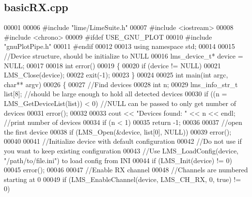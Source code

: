 \subsection{basic\+R\+X.\+cpp}
\label{basicRX_8cpp_source}

\begin{DoxyCode}
00001 
00006 \textcolor{preprocessor}{#include "lime/LimeSuite.h"}
00007 \textcolor{preprocessor}{#include <iostream>}
00008 \textcolor{preprocessor}{#include <chrono>}
00009 \textcolor{preprocessor}{#ifdef USE\_GNU\_PLOT}
00010 \textcolor{preprocessor}{#include "gnuPlotPipe.h"}
00011 \textcolor{preprocessor}{#endif}
00012 
00013 \textcolor{keyword}{using namespace }std;
00014 
00015 \textcolor{comment}{//Device structure, should be initialize to NULL}
00016 lms_device_t* device = NULL;
00017 
00018 \textcolor{keywordtype}{int} error()
00019 \{
00020     \textcolor{keywordflow}{if} (device != NULL)
00021         LMS_Close(device);
00022     exit(-1);
00023 \}
00024 
00025 \textcolor{keywordtype}{int} main(\textcolor{keywordtype}{int} argc, \textcolor{keywordtype}{char}** argv)
00026 \{
00027     \textcolor{comment}{//Find devices}
00028     \textcolor{keywordtype}{int} n;
00029     lms_info_str_t list[8]; \textcolor{comment}{//should be large enough to hold all detected devices}
00030     \textcolor{keywordflow}{if} ((n = LMS_GetDeviceList(list)) < 0) \textcolor{comment}{//NULL can be passed to only get number of devices}
00031         error();
00032 
00033     cout << \textcolor{stringliteral}{"Devices found: "} << n << endl; \textcolor{comment}{//print number of devices}
00034     \textcolor{keywordflow}{if} (n < 1)
00035         \textcolor{keywordflow}{return} -1;
00036 
00037     \textcolor{comment}{//open the first device}
00038     \textcolor{keywordflow}{if} (LMS_Open(&device, list[0], NULL))
00039         error();
00040 
00041     \textcolor{comment}{//Initialize device with default configuration}
00042     \textcolor{comment}{//Do not use if you want to keep existing configuration}
00043     \textcolor{comment}{//Use LMS\_LoadConfig(device, "/path/to/file.ini") to load config from INI}
00044     \textcolor{keywordflow}{if} (LMS_Init(device) != 0)
00045         error();
00046 
00047     \textcolor{comment}{//Enable RX channel}
00048     \textcolor{comment}{//Channels are numbered starting at 0}
00049     \textcolor{keywordflow}{if} (LMS_EnableChannel(device, LMS_CH_RX, 0, \textcolor{keyword}{true}) != 0)

\end{DoxyCode}
